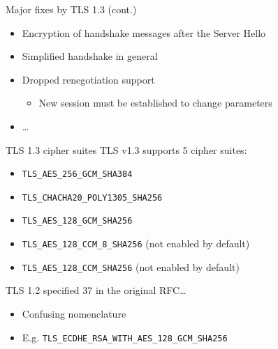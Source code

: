 \begin{frame}{Major fixes by TLS 1.3 (cont.)}
  \begin{itemize}[<+(1)->]
    \item Encryption of handshake messages after the Server Hello
    \item Simplified handshake in general
    \item Dropped renegotiation support
    \begin{itemize}
      \item New session must be established to change parameters
    \end{itemize}
    \item \dots
  \end{itemize}
\end{frame}

\begin{frame}{TLS 1.3 cipher suites}
  TLS v1.3 supports 5 cipher suites:
  \pause
  \begin{itemize}
    \item {\small\texttt{TLS\_AES\_256\_GCM\_SHA384}}
    \item {\small\texttt{TLS\_CHACHA20\_POLY1305\_SHA256}}
    \item {\small\texttt{TLS\_AES\_128\_GCM\_SHA256}}
    \pause
    \item {\small\texttt{TLS\_AES\_128\_CCM\_8\_SHA256}} (not enabled by default)
    \item {\small\texttt{TLS\_AES\_128\_CCM\_SHA256}} (not enabled by default)
  \end{itemize}

  \pause
  TLS 1.2 specified 37 in the original RFC\dots
  \begin{itemize}[<+(1)->]
    \item Confusing nomenclature
    \item E.g. {\small\texttt{TLS\_ECDHE\_RSA\_WITH\_AES\_128\_GCM\_SHA256}}
  \end{itemize}
\end{frame}

